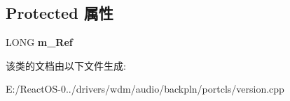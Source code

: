 \subsection*{Protected 属性}
\begin{DoxyCompactItemize}
\item 
\mbox{\label{class_c_port_cls_version_a662306cddd502c9f57a91e98a2d5e625}} 
L\+O\+NG {\bfseries m\+\_\+\+Ref}
\end{DoxyCompactItemize}


该类的文档由以下文件生成\+:\begin{DoxyCompactItemize}
\item 
E\+:/\+React\+O\+S-\/0../drivers/wdm/audio/backpln/portcls/version.\+cpp\end{DoxyCompactItemize}
